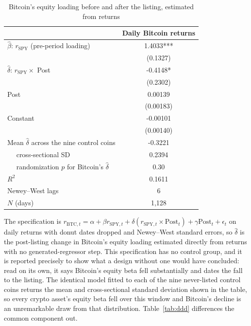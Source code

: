 \begin{table}[t]
\centering
\begin{threeparttable}
\caption{Bitcoin's equity loading before and after the listing, estimated from returns}
\label{tab:returns_interacted}
\begin{tabular}{lc}
\toprule
 & Daily Bitcoin returns \\
\midrule
$\hat\beta$: $r_{\mathrm{SPY}}$ (pre-period loading) & 1.4033*** \\
 & (0.1327) \\
$\hat\delta$: $r_{\mathrm{SPY}} \times$ Post & -0.4148* \\
 & (0.2302) \\
Post & 0.00139 \\
 & (0.00183) \\
Constant & -0.00101 \\
 & (0.00140) \\
Mean $\hat\delta$ across the nine control coins & -0.3221 \\
$\quad$ cross-sectional SD & 0.2394 \\
$\quad$ randomization $p$ for Bitcoin's $\hat\delta$ & 0.30 \\
$R^2$ & 0.1611 \\
Newey--West lags & 6 \\
$N$ (days) & 1,128 \\
\bottomrule
\end{tabular}
\begin{tablenotes}[flushleft]
\footnotesize
\item The specification is $r_{\mathrm{BTC},t} = \alpha + \beta r_{\mathrm{SPY},t} + \delta (r_{\mathrm{SPY},t} \times \mathrm{Post}_t) + \gamma \mathrm{Post}_t + \epsilon_t$ on daily returns with donut dates dropped and Newey--West standard errors, so $\hat\delta$ is the post-listing change in Bitcoin's equity loading estimated directly from returns with no generated-regressor step. This specification has no control group, and it is reported precisely to show what a design without one would have concluded: read on its own, it says Bitcoin's equity beta fell substantially and dates the fall to the listing. The identical model fitted to each of the nine never-listed control coins returns the mean and cross-sectional standard deviation shown in the table, so every crypto asset's equity beta fell over this window and Bitcoin's decline is an unremarkable draw from that distribution. Table~\ref{tab:ddd} differences the common component out.
\end{tablenotes}
\end{threeparttable}
\end{table}
